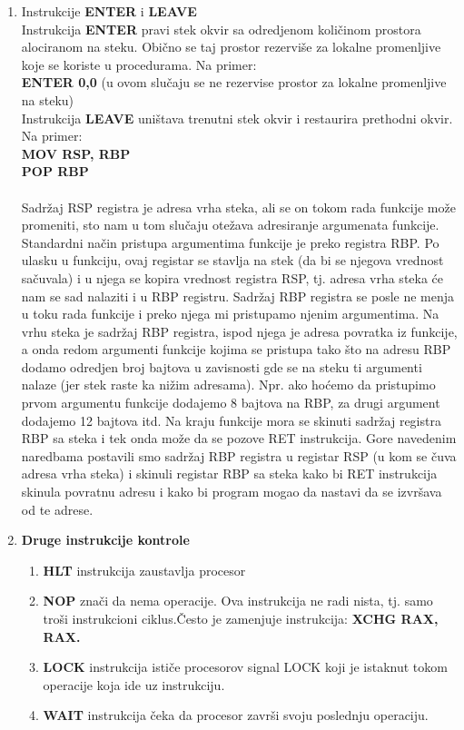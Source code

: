 \documentclass[a4paper]{article}
\begin{document}
\begin{enumerate}
\item{Instrukcije \textbf{ENTER} i \textbf{LEAVE}} \\
Instrukcija \textbf{ENTER} pravi stek okvir sa odredjenom koli\v cinom 
prostora alociranom na steku. Obi\v cno se taj prostor rezervi\v se za lokalne promenljive 
koje se koriste u procedurama. Na primer: \\
\textbf{ENTER 0,0} (u ovom slu\v caju se ne rezervise prostor za lokalne promenljive na steku)\\
Instrukcija \textbf{LEAVE} uni\v stava trenutni stek okvir i restaurira prethodni okvir. Na primer: \\
\textbf{MOV RSP, RBP}\\
\textbf{POP RBP}\\ \\
Sadr\v zaj RSP registra je adresa vrha steka, ali se on tokom rada funkcije mo\v ze promeniti, sto nam u tom 
slu\v caju ote\v zava adresiranje argumenata funkcije. Standardni na\v cin pristupa argumentima funkcije je preko registra RBP.
Po ulasku u funkciju, ovaj registar se stavlja na stek (da bi se njegova vrednost sa\v cuvala) i u njega se kopira vrednost
registra RSP, tj. adresa vrha steka \' ce nam se sad nalaziti i u RBP registru. Sadr\v zaj RBP registra se posle ne menja 
u toku rada funkcije i preko njega mi pristupamo njenim argumentima. Na vrhu steka je sadr\v zaj RBP registra, ispod njega 
je adresa povratka iz funkcije, a onda redom argumenti funkcije kojima se pristupa tako \v sto na adresu RBP dodamo 
odredjen broj bajtova u zavisnosti gde se na steku ti argumenti nalaze (jer stek raste ka ni\v zim adresama). Npr. ako 
ho\' cemo da pristupimo prvom argumentu funkcije dodajemo 8 bajtova na RBP, za drugi argument dodajemo 12 bajtova itd.
Na kraju funkcije mora se skinuti sadr\v zaj registra RBP sa steka i tek onda mo\v ze da se pozove RET instrukcija.
Gore navedenim naredbama postavili smo sadr\v zaj RBP registra u registar RSP (u kom se \v cuva adresa vrha steka) i 
skinuli registar RBP sa steka kako bi RET instrukcija skinula povratnu adresu i kako bi program mogao da
nastavi da se izvr\v sava od te adrese.

\item{\textbf{Druge instrukcije kontrole}}
\begin{enumerate}
\item{\textbf{HLT} instrukcija zaustavlja procesor} 
\item{\textbf{NOP} zna\v ci da nema operacije. Ova instrukcija ne radi nista, tj. samo tro\v si instrukcioni ciklus.\v Cesto je zamenjuje instrukcija: \textbf{XCHG RAX, RAX.}} 
\item{\textbf{LOCK} instrukcija isti\v ce procesorov signal LOCK koji je istaknut tokom operacije koja ide uz instrukciju.}
\item{\textbf{WAIT} instrukcija \v ceka da procesor zavr\v si svoju poslednju operaciju.} \\
\end{enumerate}


\end{enumerate} %
\end{document}

